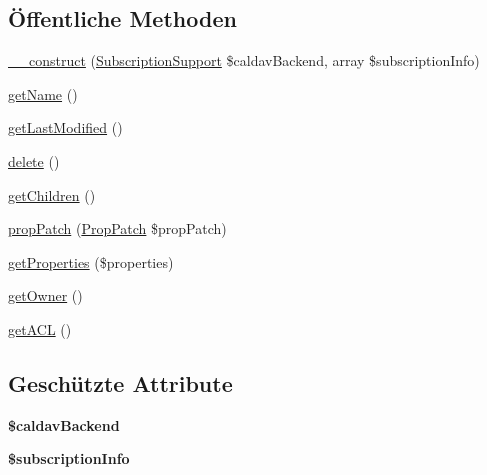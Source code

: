 \subsection*{Öffentliche Methoden}
\begin{DoxyCompactItemize}
\item 
\mbox{\hyperlink{class_sabre_1_1_cal_d_a_v_1_1_subscriptions_1_1_subscription_a714da5a8aeedcd6c9df6baf4f38a255e}{\+\_\+\+\_\+construct}} (\mbox{\hyperlink{interface_sabre_1_1_cal_d_a_v_1_1_backend_1_1_subscription_support}{Subscription\+Support}} \$caldav\+Backend, array \$subscription\+Info)
\item 
\mbox{\hyperlink{class_sabre_1_1_cal_d_a_v_1_1_subscriptions_1_1_subscription_afcc333214388d83a3c365965c45eebea}{get\+Name}} ()
\item 
\mbox{\hyperlink{class_sabre_1_1_cal_d_a_v_1_1_subscriptions_1_1_subscription_ae3763fd7e77329dfdab8e45250af7285}{get\+Last\+Modified}} ()
\item 
\mbox{\hyperlink{class_sabre_1_1_cal_d_a_v_1_1_subscriptions_1_1_subscription_a20f9c60034e7e03b6133fc70bfcea4ca}{delete}} ()
\item 
\mbox{\hyperlink{class_sabre_1_1_cal_d_a_v_1_1_subscriptions_1_1_subscription_a167dfe0d1f2dd478b1e3e80da4240d98}{get\+Children}} ()
\item 
\mbox{\hyperlink{class_sabre_1_1_cal_d_a_v_1_1_subscriptions_1_1_subscription_a54715146cf54f0368920d5fa315c609c}{prop\+Patch}} (\mbox{\hyperlink{class_sabre_1_1_d_a_v_1_1_prop_patch}{Prop\+Patch}} \$prop\+Patch)
\item 
\mbox{\hyperlink{class_sabre_1_1_cal_d_a_v_1_1_subscriptions_1_1_subscription_a69806d6c8262031418a9e0e19e36a8b7}{get\+Properties}} (\$properties)
\item 
\mbox{\hyperlink{class_sabre_1_1_cal_d_a_v_1_1_subscriptions_1_1_subscription_a3a73ec58f4ea3410a5341d7af1611d20}{get\+Owner}} ()
\item 
\mbox{\hyperlink{class_sabre_1_1_cal_d_a_v_1_1_subscriptions_1_1_subscription_a156a1762940f1732231c0d4328c52aa8}{get\+A\+CL}} ()
\end{DoxyCompactItemize}
\subsection*{Geschützte Attribute}
\begin{DoxyCompactItemize}
\item 
\mbox{\label{class_sabre_1_1_cal_d_a_v_1_1_subscriptions_1_1_subscription_af3fcd6864f39813e9ee2882abafeb715}} 
{\bfseries \$caldav\+Backend}
\item 
\mbox{\label{class_sabre_1_1_cal_d_a_v_1_1_subscriptions_1_1_subscription_aac3550498506d0c54db570bf74c465c4}} 
{\bfseries \$subscription\+Info}
\end{DoxyCompactItemize}


